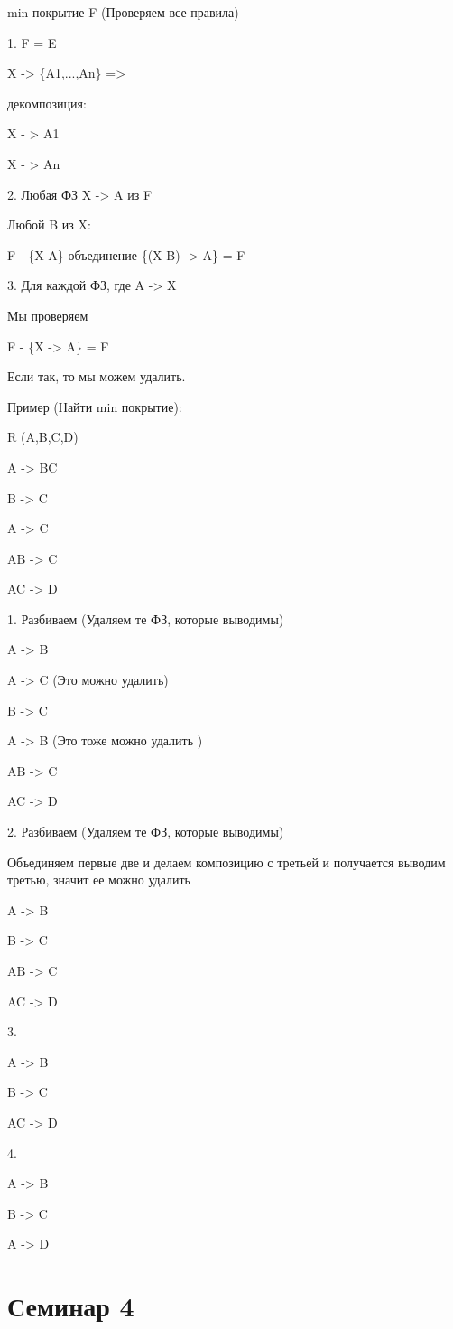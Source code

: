 min покрытие F (Проверяем все правила)

1. F = E

X -> \{A1,...,An\} =>

декомпозиция:

X - > A1

X - > An

2. Любая ФЗ X -> A из F

Любой B из X:

F - \{X-A\} объединение \{(X-B) -> A\} = F

3. Для каждой ФЗ, где A -> X

Мы проверяем

F - \{X -> A\} = F

Если так, то мы можем удалить.

Пример (Найти min покрытие):

R (A,B,C,D)

A -> BC

B -> C

A -> C

AB -> C

AC -> D

1. Разбиваем (Удаляем те ФЗ, которые выводимы)

A -> B

A -> C (Это можно удалить)

B -> C

A -> B (Это тоже можно удалить )

AB -> C

AC -> D

2. Разбиваем (Удаляем те ФЗ, которые выводимы)

Объединяем первые две и делаем композицию с третьей и получается выводим третью,
значит ее можно удалить

A -> B

B -> C

AB -> C

AC -> D

3.

A -> B

B -> C

AC -> D

4.

A -> B

B -> C

A -> D


\chapter{Семинар 4}

